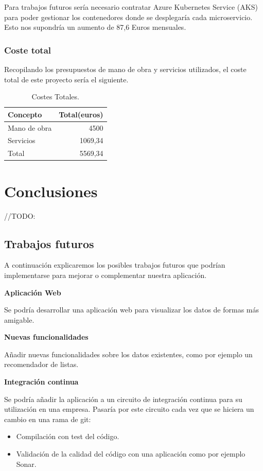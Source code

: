 \documentclass[12pt]{report} %
\begin{document}
Para trabajos futuros sería necesario contratar Azure Kubernetes Service (AKS) para poder gestionar los contenedores donde se desplegaría cada microservicio. Esto nos supondría un aumento de 87,6 Euros mensuales.

\subsection{Coste total}

Recopilando los presupuestos de mano de obra y servicios utilizados, el coste total de este proyecto sería el siguiente.

\begin{table}[H]
	\begin{center}
		\begin{tabular}{|l|r|}
			\hline
			Concepto & Total(euros) \\
			\hline \hline
			Mano de obra & 4500 \\ \hline
			Servicios & 1069,34 \\ \hline \hline
			Total & 5569,34 \\ \hline					
		\end{tabular}
		\caption{Costes Totales.}
		\label{costeTotal}
	\end{center}
\end{table}

\chapter{Conclusiones}
//TODO:
\section{Trabajos futuros}

A continuación explicaremos los posibles trabajos futuros que podrían implementarse para mejorar o complementar nuestra aplicación.

\textbf{Aplicación Web}

Se podría desarrollar una aplicación web para visualizar los datos de formas más amigable.

\textbf{Nuevas funcionalidades}

Añadir nuevas funcionalidades sobre los datos existentes, como por ejemplo un recomendador de listas.

\textbf{Integración continua}

Se podría añadir la aplicación a un circuito de integración continua para su utilización en una empresa.
Pasaría por este circuito cada vez que se hiciera un cambio en una rama de git:
\begin{itemize}
	\item Compilación con test del código.
	\item Validación de la calidad del código con una aplicación como por ejemplo Sonar.
\end{itemize}
\end{document}
